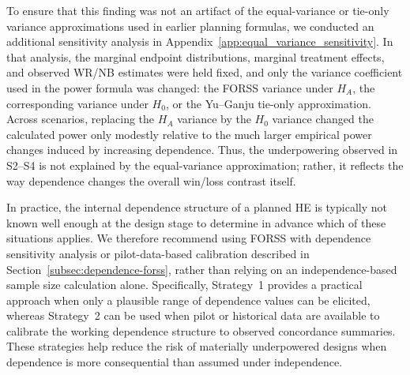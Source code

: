 To ensure that this finding was not an artifact of the equal-variance or tie-only variance approximations used in earlier planning formulas, we conducted an additional sensitivity analysis in Appendix~\ref{app:equal_variance_sensitivity}. In that analysis, the marginal endpoint distributions, marginal treatment effects, and observed WR/NB estimates were held fixed, and only the variance coefficient used in the power formula was changed: the FORSS variance under $H_A$, the corresponding variance under $H_0$, or the Yu--Ganju tie-only approximation. Across scenarios, replacing the $H_A$ variance by the $H_0$ variance changed the calculated power only modestly relative to the much larger empirical power changes induced by increasing dependence. Thus, the underpowering observed in S2--S4 is not explained by the equal-variance approximation; rather, it reflects the way dependence changes the overall win/loss contrast itself.

In practice, the internal dependence structure of a planned HE is typically not known well enough at the design stage to determine in advance which of these situations applies. We therefore recommend using FORSS with dependence sensitivity analysis or pilot-data-based calibration described in Section~\ref{subsec:dependence-forss}, rather than relying on an independence-based sample size calculation alone. Specifically, Strategy~1 provides a practical approach when only a plausible range of dependence values can be elicited, whereas Strategy~2 can be used when pilot or historical data are available to calibrate the working dependence structure to observed concordance summaries. These strategies help reduce the risk of materially underpowered designs when dependence is more consequential than assumed under independence.
